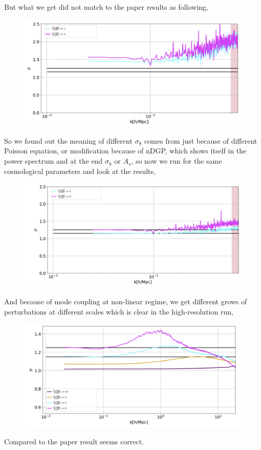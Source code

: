 \documentclass[a4paper,10pt]{article}
\begin{document}
   But what we get did not match to the paper results as following,
            \begin{figure}[H]
 \includegraphics[scale=0.5]{./Images/ndgp_001} 
 \end{figure}
 So we found out the meaning of different $\sigma_8$ comes from just because of different Poisson equation, or modification because of nDGP, which shows itself in the power spectrum and at the end $\sigma_8$ or $A_s$, so now we run for the same cosmological parameters and look at the results,
          \begin{figure}[H]
 \includegraphics[scale=0.5]{./Images/ndgp_002} 
 \end{figure}
 And because of mode coupling at non-linear regime, we get different grows of perturbations at different scales which is clear in the high-resolution run,
          \begin{figure}[H]
 \includegraphics[scale=0.5]{./Images/ndgp_003} 
 \end{figure}
 Compared to the paper result seems correct.
 
\end{document}
